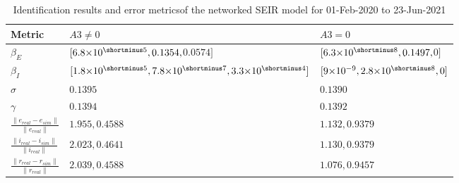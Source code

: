 \begin{table}[h]
     \centering
     \caption[]{Identification results and error metrics\footnotemark of the networked SEIR model for 01-Feb-2020 to 23-Jun-2021}
     \begin{tabular*}{\linewidth}{l||p{3.1cm}|p{3.1cm}}
     Metric & $A3 \neq 0$ & $A3 = 0$ \\
     \hline
     \hline
     $\beta_E$ &$[6.8 {\times} 10^{\shortminus5},\linebreak[1] 0.1354,$\newline$ 0.0574]$ &$[6.3 {\times} 10^{\shortminus8},\linebreak[1] 0.1497,$\newline$ 0]$\\
     $\beta_I$ &$[1.8 {\times} 10^{\shortminus5},\linebreak[1] 7.8 {\times} 10^{\shortminus7},\linebreak[1] 3.3 {\times} 10^{\shortminus4}]$ &$[9 {\times} 10^{-9},\linebreak[1] 2.8 {\times} 10^{\shortminus8},\linebreak[1] 0]$\\
     $\sigma$ &$0.1395$ &$0.1390$\\
     $\gamma$ &$0.1394$ &$0.1392$\\
     $\frac{\lVert e_{real} - e_{sim} \rVert}{\lVert e_{real} \rVert}$ &$1.955, 0.4588$ &$1.132, 0.9379$\\
     $\frac{\lVert i_{real} - i_{sim} \rVert}{\lVert i_{real} \rVert}$ &$2.023, 0.4641$ &$1.130, 0.9379$\\
     $\frac{\lVert r_{real} - r_{sim} \rVert}{\lVert r_{real} \rVert}$ &$2.039, 0.4588$ &$1.076, 0.9457$\\
     \hline
     \end{tabular*}
     \label{tbl:seirParametersAndError}
\end{table}
    
